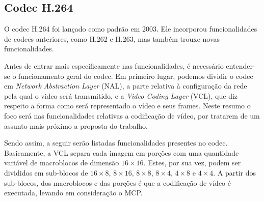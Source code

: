 \documentclass[cic,tc]{iiufrgs}
\begin{document}
\subsection*{Codec H.264}
O codec H.264 foi lançado como padrão em 2003.
Ele incorporou funcionalidades de codecs anteriores, como H.262 e H.263, mas também
trouxe novas funcionalidades.

Antes de entrar mais especificamente nas funcionalidades, é necessário entender-se o 
funcionamento geral do codec.
Em primeiro lugar, podemos dividir o codec em \emph{Network Abstraction Layer} (NAL), a parte
relativa à configuração da rede pela qual o video será transmitido,
e a \emph{Video Coding Layer} (VCL), que diz respeito a forma como será representado o vídeo 
e seus frames.
Neste resumo o foco será nas funcionalidades relativas a codificação de vídeo, 
por tratarem de um assunto mais próximo a proposta do trabalho.

Sendo assim, a seguir serão listadas funcionalidades presentes no codec.
Basicamente, a VCL separa cada imagem em porções com uma quantidade variável de macroblocos 
de dimensão $16\times16$.
Estes, por sua vez, podem ser divididos em sub-blocos de $16\times8$, $8\times16$,
$8\times8$, $8\times4$, $4\times8$ e $4\times4$.
A partir dos sub-blocos, dos macroblocos e das porções é que a codificação de vídeo 
é executada, levando em consideração o MCP.
\end{document}
